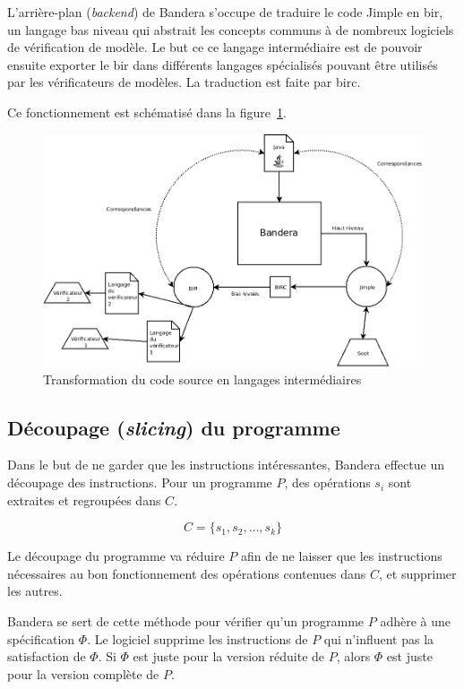 L'arrière-plan (\textit{backend}) de Bandera s'occupe de traduire le
code Jimple en \gls{bir}, un langage bas niveau qui abstrait les
concepts communs à de nombreux logiciels de vérification de modèle. Le
but ce ce langage intermédiaire est de pouvoir ensuite exporter le
\gls{bir} dans différents langages spécialisés pouvant être utilisés
par les vérificateurs de modèles. La traduction est faite par
\gls{birc}.

Ce fonctionnement est schématisé dans la figure~\ref{fig:bir_jimple}.

\begin{figure}[ht]
  \centering
  \includegraphics[scale=0.5]{images/bandera_bir_jimple.png}
  \caption{\label{fig:bir_jimple} Transformation du code source en
    langages intermédiaires}
\end{figure}


\subsection{Découpage (\textit{slicing}) du programme}

Dans le but de ne garder que les instructions intéressantes, Bandera
effectue un découpage des instructions. Pour un programme $P$, des
opérations $s_i$ sont extraites et regroupées dans $C$.

$$C = \{s_1, s_2, \ldots, s_k\}$$

Le découpage du programme va réduire $P$ afin de ne laisser que les
instructions nécessaires au bon fonctionnement des opérations
contenues dans $C$, et supprimer les autres.

Bandera se sert de cette méthode pour vérifier qu'un programme $P$
adhère à une spécification $\Phi$. Le logiciel supprime les
instructions de $P$ qui n'influent pas la satisfaction de $\Phi$. Si
$\Phi$ est juste pour la version réduite de $P$, alors $\Phi$ est
juste pour la version complète de $P$.

